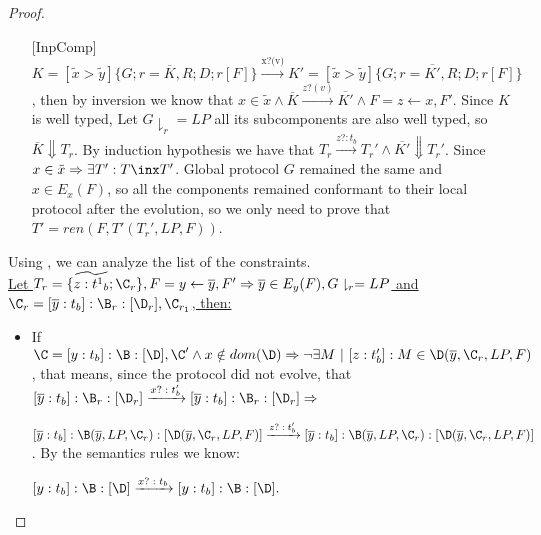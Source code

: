 \begin{proof}

 


\begin{itemize} 
\item [{[InpComp]}]
$K=[\tilde{x}>\tilde{y}]\{G;r=\overline{K},R;D;r[F]\}\xrightarrow{\text{x?(v)}} K'=[\tilde{x}>\tilde{y}]\{G;r=\overline{K'},R;D;r[F]\}$, then by inversion we know that $x\in \tilde{x} \wedge \overline{K}\xrightarrow{z?(v)}\overline{K'} \wedge F=z\leftarrow x,F'$. Since $K$ is well typed, Let $G\downharpoonright_r=LP$ all its subcomponents are also well typed, so $\overline{K}\Downarrow T_r$. By induction hypothesis we have that $T_r\xrightarrow{\text{$z?:t_b$}} T_r' \wedge \overline{K'}\Downarrow T_r'$. Since $x\in \tilde{x} \Rightarrow \exists T': T\inx T'$. Global protocol $G$ remained the same and $x\in E_x(F)$, so all the components remained conformant to their local protocol after the evolution, so we only need to prove that $T'=ren(F,T'(T_r',LP,F))$.\\

 \end{itemize}

Using , we can analyze the list of the constraints.\\ 




\underline{Let $T_r=\{\widetilde{z:{t^1}_b};\C_r\},F=y\leftarrow \overline{y},F'\Rightarrow \overline{y}\in E_y(F), G\downharpoonright_r=LP$ and $\C_r=[\overline{y}:t_b]:\B_r:[\D_r],\C_{r_1}$, then:}

\begin{itemize}

\item If $\C=[y:t_b]:\B:[\D],\C' \wedge x\notin dom(\D) \Rightarrow \neg \exists M\ |\  [z:t_b']:M \in \D(\overline{y},\C_r,LP,F)$, that means, since the protocol did not evolve, that\\


$[\overline{y}:t_b]:\B_r:[\D_r]\xrightarrow{\text{$x?:t_b'$}} [\overline{y}:t_b]:\B_r:[\D_r]\Rightarrow $

$[\overline{y}:t_b]:\B(\overline{y},LP,\C_r):[\D(\overline{y},\C_r,LP,F)]\xrightarrow{\text{$z?:t_b'$}}[\overline{y}:t_b]:\B(\overline{y},LP,\C_r):[\D(\overline{y},\C_r,LP,F)]$. By the semantics rules we know:

$[y:t_b]:\B:[\D]\xrightarrow{\text{$x?:t_b$}} [y:t_b]:\B:[\D]. $\\



\end{itemize}
\end{proof}

